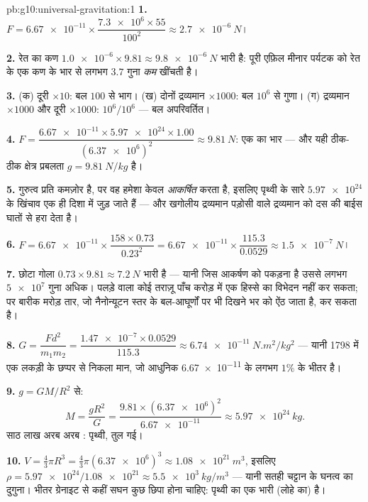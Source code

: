 \begin{solution}{pb:g10:universal-gravitation:1}
\textbf{1.} $F = \num{6.67e-11} \times
\dfrac{\num{7.3e6} \times 55}{100^2} \approx \qty{2.7e-6}{N}$।

\textbf{2.} रेत का कण $\num{1.0e-6} \times 9.81 \approx \qty{9.8e-6}{N}$ भारी है: पूरी एफ़िल मीनार पर्यटक को रेत के
एक कण के भार से लगभग $3.7$ गुना \emph{कम} खींचती है।

\textbf{3.} (क) दूरी $\times 10$: बल $100$ से भाग। (ख) दोनों द्रव्यमान
$\times 1000$: बल $10^6$ से गुणा। (ग) द्रव्यमान $\times 1000$ और दूरी $\times 1000$:
$10^6 / 10^6$ --- बल अपरिवर्तित।

\textbf{4.} $F = \dfrac{\num{6.67e-11} \times \num{5.97e24} \times
1.00}{(\num{6.37e6})^2} \approx \qty{9.81}{N}$: एक  का भार --- और यही
ठीक-ठीक क्षेत्र प्रबलता $g = \qty{9.81}{N/kg}$ है।

\textbf{5.} गुरुत्व प्रति  कमज़ोर है, पर वह हमेशा
केवल \emph{आकर्षित} करता है, इसलिए पृथ्वी के सारे $\num{5.97e24}$
 के खिंचाव एक ही दिशा में जुड़ जाते हैं --- और खगोलीय
द्रव्यमान पड़ोसी वाले द्रव्यमान को दस की बाईस घातों से हरा देता है।

\textbf{6.} $F = \num{6.67e-11} \times \dfrac{158 \times 0.73}{0.23^2}
= \num{6.67e-11} \times \dfrac{115.3}{0.0529}
\approx \qty{1.5e-7}{N}$।

\textbf{7.} छोटा गोला $0.73 \times 9.81 \approx \qty{7.2}{N}$ भारी है --- यानी जिस आकर्षण को पकड़ना है
उससे लगभग $\num{5e7}$ गुना अधिक। पलड़े वाला कोई तराज़ू पाँच करोड़ में एक
हिस्से का विभेदन नहीं कर सकता; पर बारीक मरोड़ तार, जो नैनोन्यूटन स्तर
के बल-आघूर्णों पर भी दिखने भर को ऐंठ जाता है, कर सकता है।

\textbf{8.} $G = \dfrac{F d^2}{m_1 m_2}
= \dfrac{\num{1.47e-7} \times 0.0529}{115.3}
\approx \qty{6.74e-11}{N.m^2/kg^2}$ --- यानी 1798 में एक लकड़ी के छप्पर से निकला मान,
जो आधुनिक \num{6.67e-11} के लगभग $1\%$ के भीतर है।

\textbf{9.} $g = G M / R^2$ से:
\[
M = \frac{g R^2}{G}
= \frac{9.81 \times (\num{6.37e6})^2}{\num{6.67e-11}}
\approx \qty{5.97e24}{kg}.
\]
साठ लाख अरब अरब : पृथ्वी, तुल गई।

\textbf{10.} $V = \frac43 \pi R^3 = \frac43 \pi
(\num{6.37e6})^3 \approx \qty{1.08e21}{m^3}$, इसलिए $\rho = \num{5.97e24}/\num{1.08e21} \approx \qty{5.5e3}{kg/m^3}$ --- यानी सतही चट्टान के घनत्व का
दुगुना। भीतर ग्रेनाइट से कहीं सघन कुछ छिपा होना चाहिए: पृथ्वी का एक
भारी (लोहे का)  है।


\end{solution}
